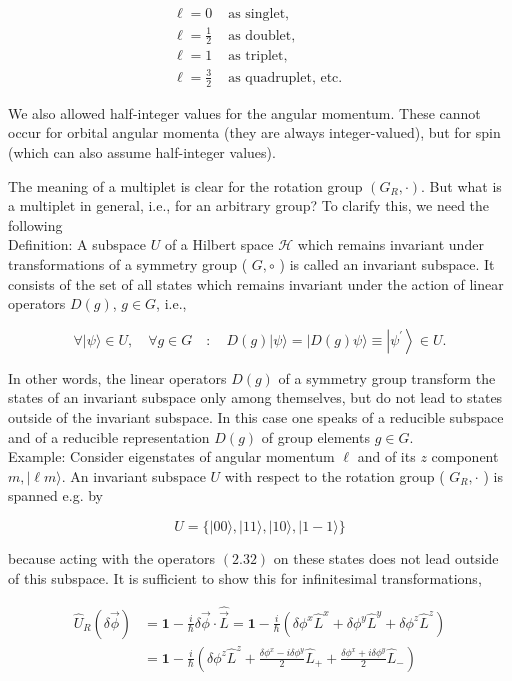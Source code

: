 \documentclass[10pt, letterpaper]{article}
\begin{document}
$$
\begin{array}{ll}
\ell=0 & \text { as singlet, } \\
\ell=\frac{1}{2} & \text { as doublet, } \\
\ell=1 & \text { as triplet, } \\
\ell=\frac{3}{2} & \text { as quadruplet, etc. }
\end{array}
$$

We also allowed half-integer values for the angular momentum. These cannot occur for orbital angular momenta (they are always integer-valued), but for spin (which can also assume half-integer values).

The meaning of a multiplet is clear for the rotation group $\left(G_{R}, \cdot\right)$. But what is a multiplet in general, i.e., for an arbitrary group? To clarify this, we need the following\\
Definition: A subspace $U$ of a Hilbert space $\mathcal{H}$ which remains invariant under transformations of a symmetry group ( $G, \circ$ ) is called an invariant subspace. It consists of the set of all states which remains invariant under the action of linear operators $D(g)$, $g \in G$, i.e.,

$$
\forall|\psi\rangle \in U, \quad \forall g \in G \quad: \quad D(g)|\psi\rangle=|D(g) \psi\rangle \equiv\left|\psi^{\prime}\right\rangle \in U .
$$

In other words, the linear operators $D(g)$ of a symmetry group transform the states of an invariant subspace only among themselves, but do not lead to states outside of the invariant subspace. In this case one speaks of a reducible subspace and of a reducible representation $D(g)$ of group elements $g \in G$.\\
Example: Consider eigenstates of angular momentum $\ell$ and of its $z$ component $m,|\ell m\rangle$. An invariant subspace $U$ with respect to the rotation group ( $G_{R}, \cdot$ ) is spanned e.g. by

$$
U=\{|00\rangle,|11\rangle,|10\rangle,|1-1\rangle\}
$$

because acting with the operators $(2.32)$ on these states does not lead outside of this subspace. It is sufficient to show this for infinitesimal transformations,

$$
\begin{aligned}
\hat{U}_{R}(\delta \vec{\phi}) & =\mathbf{1}-\frac{i}{\hbar} \delta \vec{\phi} \cdot \hat{\vec{L}}=\mathbf{1}-\frac{i}{\hbar}\left(\delta \phi^{x} \hat{L}^{x}+\delta \phi^{y} \hat{L}^{y}+\delta \phi^{z} \hat{L}^{z}\right) \\
& =\mathbf{1}-\frac{i}{\hbar}\left(\delta \phi^{z} \hat{L}^{z}+\frac{\delta \phi^{x}-i \delta \phi^{y}}{2} \hat{L}_{+}+\frac{\delta \phi^{x}+i \delta \phi^{y}}{2} \hat{L}_{-}\right)
\end{aligned}
$$
\end{document}
